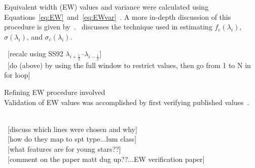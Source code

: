 Equivalent width (EW) values and variance were calculated using Equations~\ref{eq:EW}~and~\ref{eq:EWvar}~\cite{Cushing_2005}. %
A more in-depth discussion of this procedure is given by~\cite{Cushing_2005}.  \cite{Sembach_1992}~discusses the technique used in estimating $f_{c}(\lambda_{i})$, $\sigma(\lambda_{i})$, and $\sigma_{c}(\lambda_{i})$.





~[recalc using SS92 $\lambda_{i+\frac{1}{2}}$--$\lambda_{i-\frac{1}{2}}$]\\
~[do (above) by using the full window to restrict values, then go from 1 to N in for loop]


Refining EW procedure involved \\
Validation of EW values was accomplished by first verifying published values~\cite{Rayner_2009}.  

~\\~[discuss which lines were chosen and why]\\
~[how do they map to spt type...lum class]\\
~[what features are for young stars??]\\
~[comment on the paper matt dug up??...EW verification paper]



